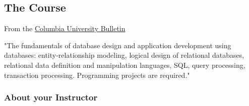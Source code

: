 \documentclass[11pt]{article}
\begin{document}
    \subsection{The Course}\label{the-course}

From the
\href{http://bulletin.columbia.edu/columbia-college/departments-instruction/computer-science/\#coursestext}{Columbia
University Bulletin}

"The fundamentals of database design and application development using
databases: entity-relationship modeling, logical design of relational
databases, relational data definition and manipulation languages, SQL,
query processing, transaction processing. Programming projects are
required."

    \subsubsection{About your Instructor}\label{about-your-instructor}
\end{document}
